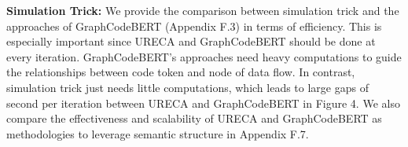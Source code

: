 \textbf{Simulation Trick: }We provide the comparison between simulation trick and the approaches of GraphCodeBERT 
(Appendix F.3) in terms of efficiency.
This is especially important since URECA and GraphCodeBERT should be done at every iteration. 
GraphCodeBERT's approaches need heavy computations to guide the relationships between code token 
and node of data flow.
In contrast, simulation trick just needs little computations, 
which leads to large gaps of second per iteration between URECA and GraphCodeBERT in Figure 4.
We also compare the effectiveness and scalability of URECA and GraphCodeBERT as methodologies to leverage semantic structure in Appendix F.7. 